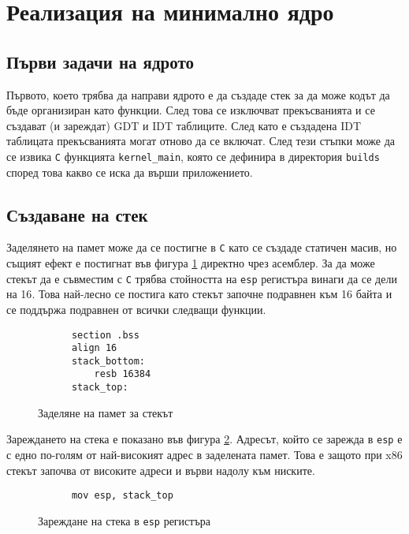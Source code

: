 \section{Реализация на минимално ядро}
  \subsection{Първи задачи на ядрото}
  Първото, което трябва да направи ядрото е да създаде стек за да може кодът да бъде организиран като функции. След това се изключват прекъсванията и се създават (и зареждат) GDT и IDT таблиците. След като е създадена IDT таблицата прекъсванията могат отново да се включат. След тези стъпки може да се извика {\tt C} функцията {\tt kernel\_main}, която се дефинира в директория {\tt builds} според това какво се иска да върши приложението.

  \subsection{Създаване на стек}
  Заделянето на памет може да се постигне в {\tt C} като се създаде статичен масив, но същият ефект е постигнат във фигура \ref{fig:stack-alloc} директно чрез асемблер. За да може стекът да е съвместим с {\tt C} трябва стойността на {\tt esp} регистъра винаги да се дели на 16\cite{sysvabi}. Това най-лесно се постига като стекът започне подравнен към 16 байта и се поддържа подравнен от всички следващи функции.

  \begin{figure}[ht]
    \centering
    \caption{Заделяне на памет за стекът}
    \begin{verbatim}
      section .bss
      align 16
      stack_bottom:
          resb 16384
      stack_top:
    \end{verbatim}
    \label{fig:stack-alloc}
  \end{figure}

  Зареждането на стека е показано във фигура \ref{fig:stack-esp}. Адресът, който се зарежда в {\tt esp} е с едно по-голям от най-високият адрес в заделената памет. Това е защото при x86 стекът започва от високите адреси и върви надолу към ниските.

  \begin{figure}[ht]
    \centering
    \caption{Зареждане на стека в {\tt esp} регистъра}
    \begin{verbatim}
      mov esp, stack_top
    \end{verbatim}
    \label{fig:stack-esp}
  \end{figure}

